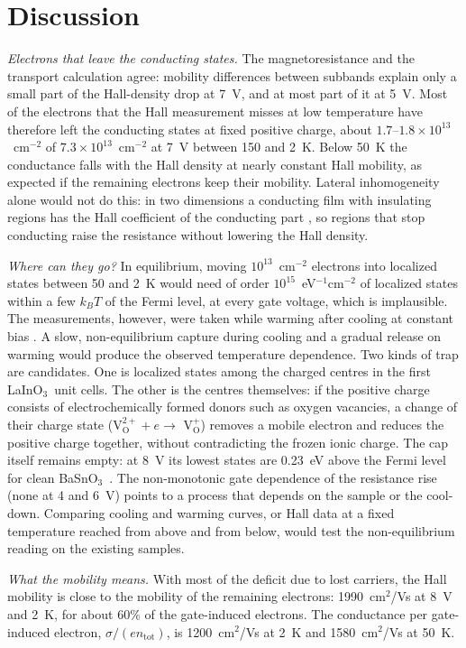 \documentclass[11pt]{article}
\newcommand{\LIO}{\texorpdfstring{LaInO$_3$}{LaInO3}}
\newcommand{\BSO}{\texorpdfstring{BaSnO$_3$}{BaSnO3}}
\newcommand{\ntot}{n_\mathrm{tot}}
\begin{document}
\section{Discussion}\label{sec:disc}
\emph{Electrons that leave the conducting states.} The magnetoresistance and the transport calculation agree: mobility differences between subbands explain only a small part of the Hall-density drop at 7~V, and at most part of it at 5~V. Most of the electrons that the Hall measurement misses at low temperature have therefore left the conducting states at fixed positive charge, about $1.7$--$1.8\times10^{13}$~cm$^{-2}$ of $7.3\times10^{13}$~cm$^{-2}$ at 7~V between 150 and 2~K. Below 50~K the conductance falls with the Hall density at nearly constant Hall mobility, as expected if the remaining electrons keep their mobility. Lateral inhomogeneity alone would not do this: in two dimensions a conducting film with insulating regions has the Hall coefficient of the conducting part \cite{Juretschke1956}, so regions that stop conducting raise the resistance without lowering the Hall density.

\emph{Where can they go?} In equilibrium, moving $10^{13}$~cm$^{-2}$ electrons into localized states between 50 and 2~K would need of order $10^{15}$~eV$^{-1}$cm$^{-2}$ of localized states within a few $k_BT$ of the Fermi level, at every gate voltage, which is implausible. The measurements, however, were taken while warming after cooling at constant bias \cite{Lee2024LIO}. A slow, non-equilibrium capture during cooling and a gradual release on warming would produce the observed temperature dependence. Two kinds of trap are candidates. One is localized states among the charged centres in the first \LIO\ unit cells. The other is the centres themselves: if the positive charge consists of electrochemically formed donors such as oxygen vacancies, a change of their charge state (V$_\mathrm{O}^{2+}+e\rightarrow$ V$_\mathrm{O}^{+}$) removes a mobile electron and reduces the positive charge together, without contradicting the frozen ionic charge. The cap itself remains empty: at 8~V its lowest states are 0.23~eV above the Fermi level for clean \BSO\ \cite{OwnbyMAT02}. The non-monotonic gate dependence of the resistance rise (none at 4 and 6~V) points to a process that depends on the sample or the cool-down. Comparing cooling and warming curves, or Hall data at a fixed temperature reached from above and from below, would test the non-equilibrium reading on the existing samples.

\emph{What the mobility means.} With most of the deficit due to lost carriers, the Hall mobility is close to the mobility of the remaining electrons: 1990~cm$^2$/Vs at 8~V and 2~K, for about 60\% of the gate-induced electrons. The conductance per gate-induced electron, $\sigma/(e\ntot)$, is 1200~cm$^2$/Vs at 2~K and 1580~cm$^2$/Vs at 50~K.
\end{document}
